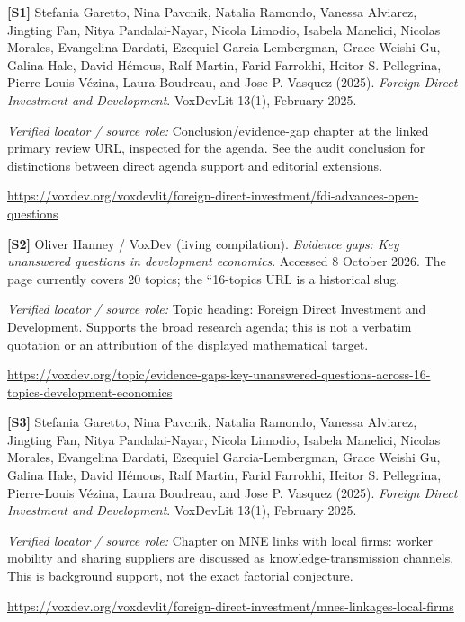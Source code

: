 \documentclass[11pt,a4paper]{article}
\begin{document}
{\footnotesize\raggedright
\par\noindent\textbf{[S1]} Stefania Garetto, Nina Pavcnik, Natalia Ramondo, Vanessa Alviarez, Jingting Fan, Nitya Pandalai-Nayar, Nicola Limodio, Isabela Manelici, Nicolas Morales, Evangelina Dardati, Ezequiel Garcia-Lembergman, Grace Weishi Gu, Galina Hale, David Hémous, Ralf Martin, Farid Farrokhi, Heitor S. Pellegrina, Pierre-Louis Vézina, Laura Boudreau, and Jose P. Vasquez (2025). \emph{Foreign Direct Investment and Development}. VoxDevLit 13(1), February 2025.\par \textit{Verified locator / source role:} Conclusion/evidence-gap chapter at the linked primary review URL, inspected for the agenda. See the audit conclusion for distinctions between direct agenda support and editorial extensions.\par \url{https://voxdev.org/voxdevlit/foreign-direct-investment/fdi-advances-open-questions}\par\smallskip
\par\noindent\textbf{[S2]} Oliver Hanney / VoxDev (living compilation). \emph{Evidence gaps: Key unanswered questions in development economics}. Accessed 8 October 2026. The page currently covers 20 topics; the ``16-topics URL is a historical slug.\par \textit{Verified locator / source role:} Topic heading: Foreign Direct Investment and Development. Supports the broad research agenda; this is not a verbatim quotation or an attribution of the displayed mathematical target.\par \url{https://voxdev.org/topic/evidence-gaps-key-unanswered-questions-across-16-topics-development-economics}\par\smallskip
\par\noindent\textbf{[S3]} Stefania Garetto, Nina Pavcnik, Natalia Ramondo, Vanessa Alviarez, Jingting Fan, Nitya Pandalai-Nayar, Nicola Limodio, Isabela Manelici, Nicolas Morales, Evangelina Dardati, Ezequiel Garcia-Lembergman, Grace Weishi Gu, Galina Hale, David Hémous, Ralf Martin, Farid Farrokhi, Heitor S. Pellegrina, Pierre-Louis Vézina, Laura Boudreau, and Jose P. Vasquez (2025). \emph{Foreign Direct Investment and Development}. VoxDevLit 13(1), February 2025.\par \textit{Verified locator / source role:} Chapter on MNE links with local firms: worker mobility and sharing suppliers are discussed as knowledge-transmission channels. This is background support, not the exact factorial conjecture.\par \url{https://voxdev.org/voxdevlit/foreign-direct-investment/mnes-linkages-local-firms}\par\smallskip
}
\end{document}
